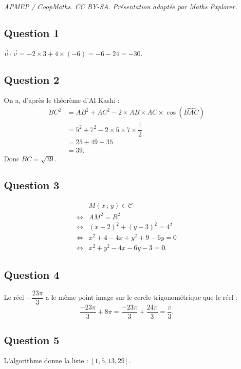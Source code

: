 \documentclass[10pt]{article}
\begin{document}
\noindent\textit{APMEP / CoopMaths. CC BY-SA. Présentation adaptée par Maths Explorer.}\par\medskip
\subsection*{Question 1}

\(\vec{u} \cdot \vec{v} = -2 \times 3 + 4 \times (-6) = -6 - 24 = -30\).

\subsection*{Question 2}

On a, d’après le théorème d’Al Kashi :
\begin{align*}
BC^2 &= AB^2 + AC^2 - 2 \times AB \times AC \times \cos(\widehat{BAC}) \\
&= 5^2 + 7^2 - 2 \times 5 \times 7 \times \dfrac{1}{2} \\
&= 25 + 49 - 35 \\
&= 39.
\end{align*}
Donc \(BC = \sqrt{39}\).

\subsection*{Question 3}

\begin{align*}
&M(x\,;\,y) \in \mathcal{C} \\
\iff &AM^2 = R^2 \\
\iff &(x - 2)^2 + (y - 3)^2 = 4^2 \\
\iff &x^2 + 4 - 4x + y^2 + 9 - 6y = 0 \\
\iff &x^2 + y^2 - 4x - 6y - 3 = 0.
\end{align*}

\subsection*{Question 4}

Le réel \(-\dfrac{23\pi}{3}\) a le même point image sur le cercle trigonométrique que le réel :
\[
\dfrac{-23\pi}{3} + 8\pi = \dfrac{-23\pi}{3} + \dfrac{24\pi}{3} = \dfrac{\pi}{3}.
\]

\subsection*{Question 5}

L’algorithme donne la liste : \([1, 5, 13, 29]\).
\end{document}
